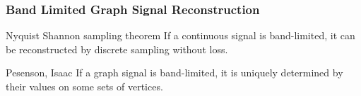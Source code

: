 \documentclass{beamer}
\begin{document}
\begin{frame}
\frametitle{Band Limited Graph Signal Reconstruction}
\begin{block}{Nyquist Shannon sampling theorem}
If a continuous signal is band-limited, it can be reconstructed by discrete sampling without loss.
\end{block}
\begin{block}{Pesenson, Isaac}
If a graph signal is band-limited, it is uniquely determined by their values on some sets of vertices.
\end{block}
\end{frame}
\end{document}
